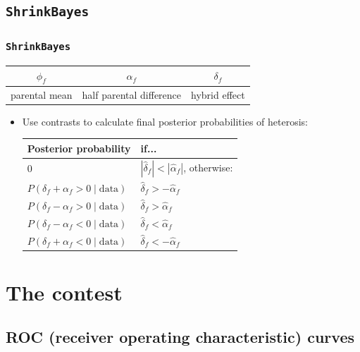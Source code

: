 \documentclass{beamer}
\providecommand{\wh}[1]{\widehat{#1}}
\numberwithin{equation}{section}
\begin{document}
\subsection{{\tt ShrinkBayes}}

\begin{frame}
\frametitle{{\tt ShrinkBayes}}


\begin{center}
\begin{tabular}{c|c|c}
$\phi_f$ & $\alpha_f$ & $\delta_f$ \\ \hline
parental mean & half parental difference & hybrid effect
\end{tabular}
\end{center}
\normalsize

\begin{itemize}
\item Use contrasts to calculate final posterior probabilities of heterosis:

\begin{center}
\begin{tabular}{l|l}
Posterior probability & if... \\ \hline
0 & $|\wh{\delta}_f| < |\wh{\alpha}_f|$, otherwise: \\
$P(\delta_f + \alpha_f > 0 \mid \text{data})$ & $\wh{\delta}_f > -\wh{\alpha}_f$ \\
$P(\delta_f - \alpha_f > 0 \mid \text{data})$ & $\wh{\delta}_f > \wh{\alpha}_f$ \\
$P(\delta_f - \alpha_f < 0 \mid \text{data})$ & $\wh{\delta}_f < \wh{\alpha}_f$ \\
$P(\delta_f + \alpha_f < 0 \mid \text{data})$ & $\wh{\delta}_f < -\wh{\alpha}_f$ \\
\end{tabular}
\end{center}

\end{itemize}
\end{frame}

\section{The contest}

\subsection{ROC (receiver operating characteristic) curves}
\end{document}
